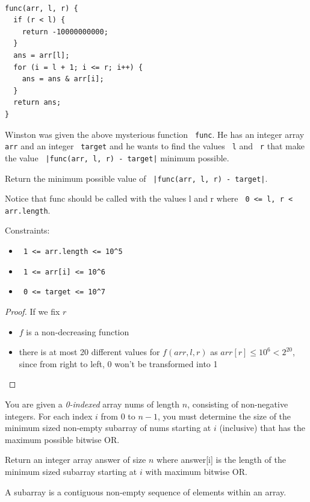 \documentclass[11pt]{article}
\let\OldTexttt\texttt
\renewcommand{\texttt}[1]{\OldTexttt{\color{MidnightBlue} #1}}
\begin{document}
\begin{problem}
​
\begin{verbatim}
func(arr, l, r) {
  if (r < l) {
    return -10000000000;
  }
  ans = arr[l];
  for (i = l + 1; i <= r; i++) {
    ans = ans & arr[i];
  }
  return ans;
}
\end{verbatim}
Winston was given the above mysterious function \texttt{func}. He has an integer array \texttt{arr} and an integer
\texttt{target} and he wants to find the values \texttt{l} and \texttt{r} that make the value \texttt{|func(arr, l, r) - target|}
minimum possible.

Return the minimum possible value of \texttt{|func(arr, l, r) - target|}.

Notice that func should be called with the values l and r where \texttt{0 <= l, r < arr.length}.

Constraints:
\begin{itemize}
\item \texttt{1 <= arr.length <= 10\textasciicircum{}5}
\item \texttt{1 <= arr[i] <= 10\textasciicircum{}6}
\item \texttt{0 <= target <= 10\textasciicircum{}7}
\end{itemize}
\end{problem}

\begin{proof}
If we fix \(r\)
\begin{itemize}
\item \(f\) is a non-decreasing function
\item there is at most 20 different values for \(f(arr,l,r)\) as \(arr[r]\le 10^6<2^{20}\), since from
right to left, 0 won't be transformed into 1
\end{itemize}
\end{proof}

\begin{problem}
You are given a \emph{0-indexed} array nums of length \(n\), consisting of non-negative integers. For
each index \(i\) from 0 to \(n-1\), you must determine the size of the minimum sized non-empty
subarray of nums starting at \(i\) (inclusive) that has the maximum possible bitwise OR.

Return an integer array answer of size \(n\) where answer[i] is the length of the minimum sized subarray
starting at \(i\) with maximum bitwise OR.

A subarray is a contiguous non-empty sequence of elements within an array.
\end{problem}
\end{document}
